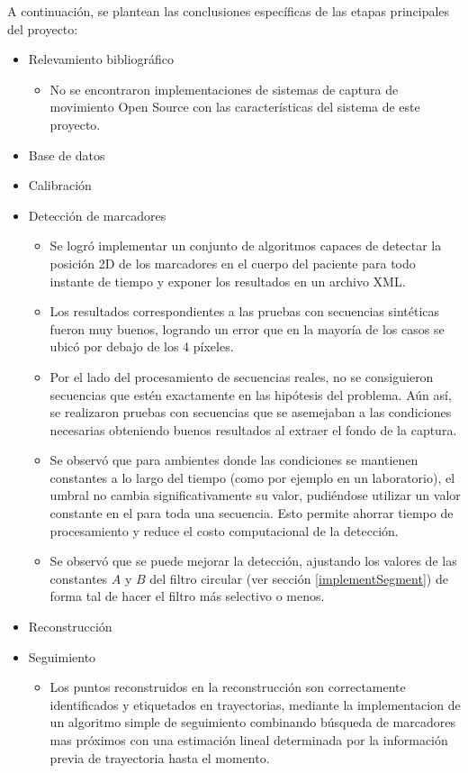 A continuación, se plantean las conclusiones específicas de las etapas principales del proyecto:
\begin{itemize}
	\item Relevamiento bibliográfico
	\begin{itemize}
		\item No se encontraron implementaciones de sistemas de captura de movimiento Open Source con las características del sistema de este proyecto. 
	\end{itemize}
	\item Base de datos
	\item Calibración
	\item Detección de marcadores
	\begin{itemize}
		\item Se logró implementar un conjunto de algoritmos capaces de detectar la posición 2D de los marcadores en el cuerpo del paciente para todo instante de tiempo y exponer los resultados en un archivo XML. 
		\item Los resultados correspondientes a las pruebas con secuencias sintéticas fueron muy buenos, logrando un error que en la mayoría de los casos se ubicó por debajo de los 4 píxeles.
		\item Por el lado del procesamiento de secuencias reales, no se consiguieron secuencias que estén exactamente en las hipótesis del problema. Aún así, se realizaron pruebas con secuencias que se asemejaban a las condiciones necesarias obteniendo buenos resultados al extraer el fondo de la captura.
		\item Se observó que para ambientes donde las condiciones se mantienen constantes a lo largo del tiempo (como por ejemplo en un laboratorio), el umbral no cambia significativamente su valor, pudiéndose utilizar un valor constante en el para toda una secuencia. Esto permite ahorrar tiempo de procesamiento y reduce el costo computacional de la detección.
		\item Se observó que se puede mejorar la detección, ajustando los valores de las constantes $A$ y $B$ del filtro circular (ver sección \ref{implementSegment}) de forma tal de hacer el filtro más selectivo o menos.
	\end{itemize}
	\item Reconstrucción
	\item Seguimiento
	
	\begin{itemize}
	
	\item Los puntos reconstruidos en la reconstrucción son correctamente identificados y etiquetados en trayectorias, mediante la implementacion de un algoritmo simple de seguimiento combinando búsqueda de marcadores mas próximos con una estimación lineal determinada por la información previa de trayectoria	hasta el momento.
	

\end{itemize}
\end{itemize}
